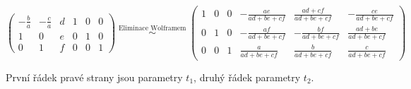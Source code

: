 \documentclass[12pt]{article}
\begin{document}
    \[
      \left(\begin{array}{ccc|ccc} 
        -\frac{b}{a} & -\frac{c}{a} & d & 1 & 0 & 0 \\
        1 & 0 & e & 0 & 1 & 0\\
        0 & 1 & f & 0 & 0 & 1 
      \end{array}\right)
      \overset{\text{Eliminace Wolframem}}{\;\sim\;}
      \left(
      \begin{array}{ccc|ccc}
      1 & 0 & 0 &
      -\frac{a e}{a d + b e + c f} &
      \frac{a d + c f}{a d + b e + c f} &
      -\frac{c e}{a d + b e + c f} \\
      0 & 1 & 0 &
      -\frac{a f}{a d + b e + c f} &
      -\frac{b f}{a d + b e + c f} &
      \frac{a d + b e}{a d + b e + c f} \\
      0 & 0 & 1 &
      \frac{a}{a d + b e + c f} &
      \frac{b}{a d + b e + c f} &
      \frac{c}{a d + b e + c f}
      \end{array}
      \right)
    \]

    První řádek pravé strany jsou parametry $t_1$, druhý řádek parametry $t_2$.
\end{document}
